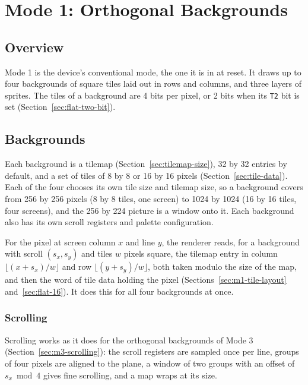 \chapter{Mode 1: Orthogonal Backgrounds}
\label{ch:mode1}

\section{Overview}

Mode 1 is the device's conventional mode, the one it is in at reset. It draws up to four backgrounds of square tiles
laid out in rows and columns, and three layers of sprites. The tiles of a background are 4 bits per pixel, or 2 bits
when its \texttt{T2} bit is set (Section~\ref{sec:flat-two-bit}).

\section{Backgrounds}

Each background is a tilemap (Section~\ref{sec:tilemap-size}), 32 by 32 entries by default, and a set of tiles of 8 by
8 or 16 by 16 pixels (Section~\ref{sec:tile-data}). Each of the four chooses its own tile size and tilemap size, so a
background covers from 256 by 256 pixels (8 by 8 tiles, one screen) to 1024 by 1024 (16 by 16 tiles, four screens), and
the 256 by 224 picture is a window onto it. Each background also has its own scroll registers and palette
configuration.

For the pixel at screen column $x$ and line $y$, the renderer reads, for a background with scroll $(s_x, s_y)$ and
tiles $w$ pixels square, the tilemap entry in column $\lfloor (x + s_x)/w \rfloor$ and row $\lfloor (y + s_y)/w
	\rfloor$, both taken modulo the size of the map, and then the word of tile data holding the pixel
(Sections~\ref{sec:m1-tile-layout} and~\ref{sec:flat-16}). It does this for all four backgrounds at once.

\subsection{Scrolling}
\label{sec:m1-scrolling}

Scrolling works as it does for the orthogonal backgrounds of Mode 3 (Section~\ref{sec:m3-scrolling}): the scroll
registers are sampled once per line, groups of four pixels are aligned to the plane, a window of two groups with an
offset of $s_x \bmod 4$ gives fine scrolling, and a map wraps at its size.

